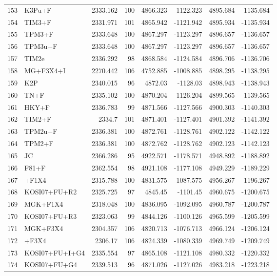 \documentclass[12pt]{article}
\begin{document}
\begin{longtable}{clrrrrrr}
	153 & K3Pu+F & 2333.162 & 100 & 4866.323 & -1122.323 & 4895.684 & -1135.684 \\ 
	154 & TIM3+F & 2331.971 & 101 & 4865.942 & -1121.942 & 4895.934 & -1135.934 \\ 
	155 & TPM3+F & 2333.648 & 100 & 4867.297 & -1123.297 & 4896.657 & -1136.657 \\ 
	156 & TPM3u+F & 2333.648 & 100 & 4867.297 & -1123.297 & 4896.657 & -1136.657 \\ 
	157 & TIM2e & 2336.292 & 98 & 4868.584 & -1124.584 & 4896.706 & -1136.706 \\ 
	158 & MG+F3X4+I & 2270.442 & 106 & 4752.885 & -1008.885 & 4898.295 & -1138.295 \\ 
	159 & K2P & 2340.015 & 96 & 4872.03 & -1128.03 & 4898.943 & -1138.943 \\ 
	160 & TN+F & 2335.102 & 100 & 4870.204 & -1126.204 & 4899.565 & -1139.565 \\ 
	161 & HKY+F & 2336.783 & 99 & 4871.566 & -1127.566 & 4900.303 & -1140.303 \\ 
	162 & TIM2+F & 2334.7 & 101 & 4871.401 & -1127.401 & 4901.392 & -1141.392 \\ 
	163 & TPM2u+F & 2336.381 & 100 & 4872.761 & -1128.761 & 4902.122 & -1142.122 \\ 
	164 & TPM2+F & 2336.381 & 100 & 4872.762 & -1128.762 & 4902.123 & -1142.123 \\ 
	165 & JC & 2366.286 & 95 & 4922.571 & -1178.571 & 4948.892 & -1188.892 \\ 
	166 & F81+F & 2362.554 & 98 & 4921.108 & -1177.108 & 4949.229 & -1189.229 \\ 
	167 & \gy+F1X4 & 2315.788 & 100 & 4831.575 & -1087.575 & 4956.267 & -1196.267 \\ 
	168 & KOSI07+FU+R2 & 2325.725 & 97 & 4845.45 & -1101.45 & 4960.675 & -1200.675 \\ 
	169 & MGK+F1X4 & 2318.048 & 100 & 4836.095 & -1092.095 & 4960.787 & -1200.787 \\ 
	170 & KOSI07+FU+R3 & 2323.063 & 99 & 4844.126 & -1100.126 & 4965.599 & -1205.599 \\ 
	171 & MGK+F3X4 & 2304.357 & 106 & 4820.713 & -1076.713 & 4966.124 & -1206.124 \\ 
	172 & \gy+F3X4 & 2306.17 & 106 & 4824.339 & -1080.339 & 4969.749 & -1209.749 \\ 
	173 & KOSI07+FU+I+G4 & 2335.554 & 97 & 4865.108 & -1121.108 & 4980.332 & -1220.332 \\ 
	174 & KOSI07+FU+G4 & 2339.513 & 96 & 4871.026 & -1127.026 & 4983.218 & -1223.218 \\ 

\end{longtable}
\end{document}
